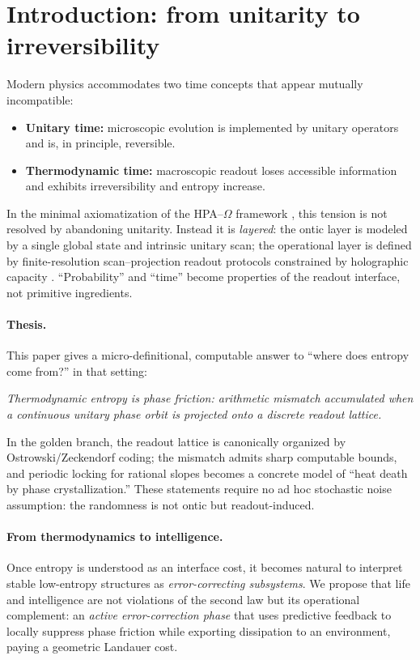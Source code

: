 \section{Introduction: from unitarity to irreversibility}
\label{sec:introduction}

Modern physics accommodates two time concepts that appear mutually incompatible:
\begin{itemize}
  \item \textbf{Unitary time:} microscopic evolution is implemented by unitary operators and is, in principle, reversible.
  \item \textbf{Thermodynamic time:} macroscopic readout loses accessible information and exhibits irreversibility and entropy increase.
\end{itemize}

\noindent In the minimal axiomatization of the HPA--$\Omega$ framework \cite{Ma2025FoP,Ma2025HPOT}, this tension is not resolved by abandoning unitarity. Instead it is \emph{layered}: the ontic layer is modeled by a single global state and intrinsic unitary scan; the operational layer is defined by finite-resolution scan--projection readout protocols constrained by holographic capacity \cite{tHooft1993,Susskind1995,Bousso2002}. ``Probability'' and ``time'' become properties of the readout interface, not primitive ingredients.

\paragraph{Thesis.}
This paper gives a micro-definitional, computable answer to ``where does entropy come from?'' in that setting:
\begin{center}
\emph{Thermodynamic entropy is phase friction: arithmetic mismatch accumulated when a continuous unitary phase orbit is projected onto a discrete readout lattice.}
\end{center}
In the golden branch, the readout lattice is canonically organized by Ostrowski/Zeckendorf coding; the mismatch admits sharp computable bounds, and periodic locking for rational slopes becomes a concrete model of ``heat death by phase crystallization.'' These statements require no ad hoc stochastic noise assumption: the randomness is not ontic but readout-induced.

\paragraph{From thermodynamics to intelligence.}
Once entropy is understood as an interface cost, it becomes natural to interpret stable low-entropy structures as \emph{error-correcting subsystems}. We propose that life and intelligence are not violations of the second law but its operational complement: an \emph{active error-correction phase} that uses predictive feedback to locally suppress phase friction while exporting dissipation to an environment, paying a geometric Landauer cost.

